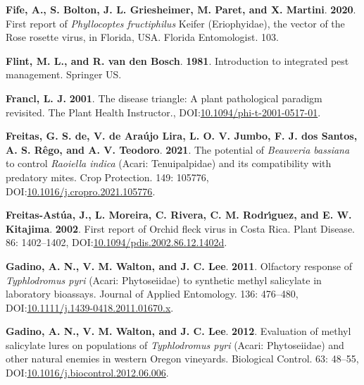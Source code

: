 \documentclass[12pt,final,CPage]{ufthesis}
\newlength{\cslhangindent}
\newenvironment{CSLReferences}[2] %
{%
	\setlength{\parindent}{0pt}
	\ifodd #1 \everypar{\setlength{\hangindent}{\cslhangindent}}\ignorespaces\fi
	\ifnum #2 > 0
	\setlength{\parskip}{#2\baselineskip}
	\fi
}%
{}
\begin{document}
{\begin{CSLReferences}{1}{0}
  \leavevmode{}%
  \textbf{Fife, A., S. Bolton, J. L. Griesheimer, M. Paret, and X. Martini}. \textbf{2020}. First report of {\emph{Phyllocoptes fructiphilus}} {Keifer} ({Eriophyidae}), the vector of the {Rose rosette virus}, in {Florida}, {USA}. Florida Entomologist. 103.

  \leavevmode{}%
  \textbf{Flint, M. L., and R. van den Bosch}. \textbf{1981}. Introduction to integrated pest management. Springer {US}.

  \leavevmode{}%
  \textbf{Francl, L. J.} \textbf{2001}. The disease triangle: A plant pathological paradigm revisited. The Plant Health Instructor., DOI:\href{https://doi.org/10.1094/phi-t-2001-0517-01}{10.1094/phi-t-2001-0517-01}.

  \leavevmode{}%
  \textbf{Freitas, G. S. de, V. de Araújo Lira, L. O. V. Jumbo, F. J. dos Santos, A. S. Rêgo, and A. V. Teodoro}. \textbf{2021}. The potential of {\emph{Beauveria bassiana}} to control {\emph{Raoiella indica}} ({Acari}: {Tenuipalpidae}) and its compatibility with predatory mites. Crop Protection. 149: 105776, DOI:\href{https://doi.org/10.1016/j.cropro.2021.105776}{10.1016/j.cropro.2021.105776}.

  \leavevmode{}%
  \textbf{Freitas-Astúa, J., L. Moreira, C. Rivera, C. M. Rodrı́guez, and E. W. Kitajima}. \textbf{2002}. First report of {Orchid fleck virus} in {Costa Rica}. Plant Disease. 86: 1402--1402, DOI:\href{https://doi.org/10.1094/pdis.2002.86.12.1402d}{10.1094/pdis.2002.86.12.1402d}.

  \leavevmode{}%
  \textbf{Gadino, A. N., V. M. Walton, and J. C. Lee}. \textbf{2011}. Olfactory response of {\emph{Typhlodromus pyri}} {({Acari}: {Phytoseiidae})} to synthetic methyl salicylate in laboratory bioassays. Journal of Applied Entomology. 136: 476--480, DOI:\href{https://doi.org/10.1111/j.1439-0418.2011.01670.x}{10.1111/j.1439-0418.2011.01670.x}.

  \leavevmode{}%
  \textbf{Gadino, A. N., V. M. Walton, and J. C. Lee}. \textbf{2012}. Evaluation of methyl salicylate lures on populations of {\emph{Typhlodromus pyri}} {({Acari}: {Phytoseiidae})} and other natural enemies in western {Oregon} vineyards. Biological Control. 63: 48--55, DOI:\href{https://doi.org/10.1016/j.biocontrol.2012.06.006}{10.1016/j.biocontrol.2012.06.006}.


\end{CSLReferences}}
\end{document}
